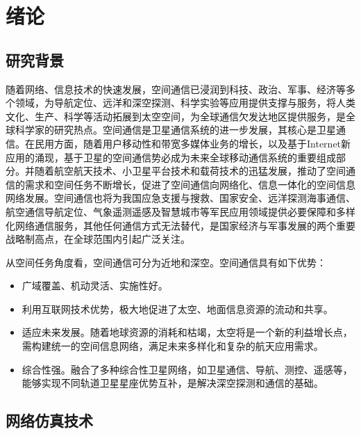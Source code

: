 \documentclass[winfonts,phd,twoside]{njuthesis}
\begin{document}
\mainmatter

\chapter{绪论}\label{chapter_introduction}
\section{研究背景}
随着网络、信息技术的快速发展，空间通信已浸润到科技、政治、军事、经济等多个领域，为导航定位、远洋和深空探测、科学实验等应用提供支撑与服务，将人类文化、生产、科学等活动拓展到太空空间，为全球通信欠发达地区提供服务，是全球科学家的研究热点。空间通信是卫星通信系统的进一步发展，其核心是卫星通信。在民用方面，随着用户移动性和带宽多媒体业务的增长，以及基于Internet新应用的涌现，基于卫星的空间通信势必成为未来全球移动通信系统的重要组成部分。并随着航空航天技术、小卫星平台技术和载荷技术的迅猛发展，推动了空间通信的需求和空间任务不断增长，促进了空间通信向网络化、信息一体化的空间信息网络发展。空间通信也将为我国应急支援与搜救、国家安全、远洋探测海事通信、航空通信导航定位、气象遥测遥感及智慧城市等军民应用领域提供必要保障和多样化网络通信服务，其他任何通信方式无法替代，是国家经济与军事发展的两个重要战略制高点，在全球范围内引起广泛关注。

从空间任务角度看，空间通信可分为近地和深空。空间通信具有如下优势：
\begin{itemize}
	\item 广域覆盖、机动灵活、实施性好。
	\item 利用互联网技术优势，极大地促进了太空、地面信息资源的流动和共享。
	\item 适应未来发展。随着地球资源的消耗和枯竭，太空将是一个新的利益增长点，需构建统一的空间信息网络，满足未来多样化和复杂的航天应用需求。
	\item 综合性强。融合了多种综合性卫星网络，如卫星通信、导航、测控、遥感等，能够实现不同轨道卫星星座优势互补，是解决深空探测和通信的基础。
\end{itemize}

\section{网络仿真技术}\label{net}
\end{document}

